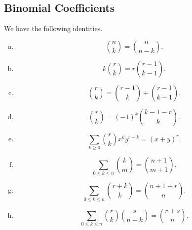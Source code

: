 \documentclass[11pt]{article}
\begin{document}
\subsection{Binomial Coefficients}
\begin{proposition}
  We have the following identities.
  \begin{enumerate}[(a)]
    \item
    \begin{equation*}
      \binom{n}{k} = \binom{n}{n-k}.
    \end{equation*}
    \item
    \begin{equation*}
      k\binom{r}{k} = r\binom{r-1}{k-1}.
    \end{equation*}
    \item
    \begin{equation*}
      \binom{r}{k} = \binom{r-1}{k} + \binom{r-1}{k-1}.
    \end{equation*}
    \item
    \begin{equation*}
      \binom{r}{k} = (-1)^k\binom{k-1-r}{k}.
    \end{equation*}
    \item
    \begin{equation*}
      \sum_{k \geq 0} \binom{r}{k} x^k y^{r-k} = (x+y)^r.
    \end{equation*}
    \item
    \begin{equation*}
      \sum_{0 \leq k \leq n} \binom{k}{m} = \binom{n+1}{m+1}.
    \end{equation*}
    \item
    \begin{equation*}
      \sum_{0 \leq k \leq n} \binom{r+k}{k} = \binom{n+1+r}{n}.
    \end{equation*}
    \item
    \begin{equation*}
      \sum_{0 \leq k \leq n} \binom{r}{k}\binom{s}{n-k} = \binom{r+s}{n}.
    \end{equation*}
  \end{enumerate}
\end{proposition}
\end{document}
